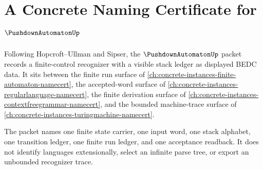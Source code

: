 \chapter{A Concrete Naming Certificate for $\PushdownAutomatonUp$}
\label{ch:concrete-instances-pushdown-automaton-namecert}

Following Hopcroft--Ullman and Sipser, the $\PushdownAutomatonUp$ packet
records a finite-control recognizer with a visible stack ledger as displayed
BEDC data. It sits between the finite run surface of
\autoref{ch:concrete-instances-finite-automaton-namecert}, the accepted-word
surface of \autoref{ch:concrete-instances-regularlanguage-namecert}, the
finite derivation surface of
\autoref{ch:concrete-instances-contextfreegrammar-namecert}, and the bounded
machine-trace surface of
\autoref{ch:concrete-instances-turingmachine-namecert}.

The packet names one finite state carrier, one input word, one stack alphabet,
one transition ledger, one finite run ledger, and one acceptance readback. It
does not identify languages extensionally, select an infinite parse tree, or
export an unbounded recognizer trace.

